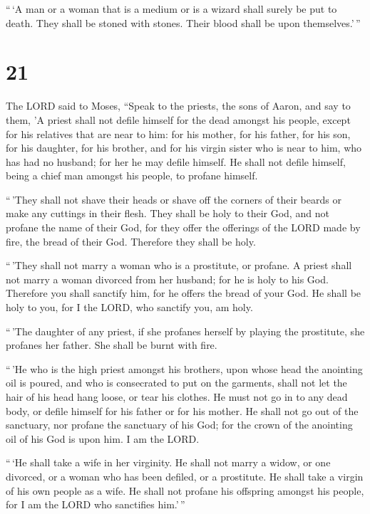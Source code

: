  ``\,`A man or a woman that is a medium or is a wizard
shall surely be put to death. They shall be stoned with stones. Their
blood shall be upon themselves.'\,''

\hypertarget{section-20}{%
\section{21}\label{section-20}}

 The LORD said to Moses, ``Speak to the priests, the sons
of Aaron, and say to them, 'A priest shall not defile himself for the
dead amongst his people,  except for his relatives that
are near to him: for his mother, for his father, for his son, for his
daughter, for his brother,  and for his virgin sister who
is near to him, who has had no husband; for her he may defile himself.
 He shall not defile himself, being a chief man amongst
his people, to profane himself.

 ``\,'They shall not shave their heads or shave off the
corners of their beards or make any cuttings in their flesh.
 They shall be holy to their God, and not profane the name
of their God, for they offer the offerings of the LORD made by fire, the
bread of their God. Therefore they shall be holy.

 ``\,'They shall not marry a woman who is a prostitute, or
profane. A priest shall not marry a woman divorced from her husband; for
he is holy to his God.  Therefore you shall sanctify him,
for he offers the bread of your God. He shall be holy to you, for I the
LORD, who sanctify you, am holy.

 ``\,'The daughter of any priest, if she profanes herself
by playing the prostitute, she profanes her father. She shall be burnt
with fire.

 ``\,'He who is the high priest amongst his brothers,
upon whose head the anointing oil is poured, and who is consecrated to
put on the garments, shall not let the hair of his head hang loose, or
tear his clothes.  He must not go in to any dead body, or
defile himself for his father or for his mother.  He
shall not go out of the sanctuary, nor profane the sanctuary of his God;
for the crown of the anointing oil of his God is upon him. I am the
LORD.

 ``\,`He shall take a wife in her virginity.
 He shall not marry a widow, or one divorced, or a woman
who has been defiled, or a prostitute. He shall take a virgin of his own
people as a wife.  He shall not profane his offspring
amongst his people, for I am the LORD who sanctifies him.'\,''


